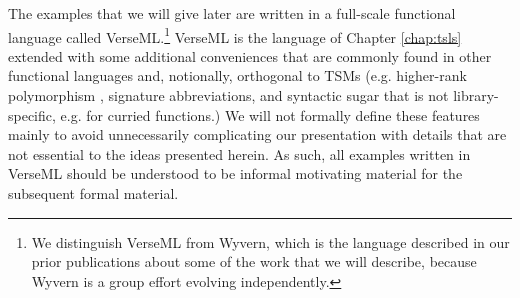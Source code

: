 The examples that we will give later are written in a full-scale functional language called VerseML.\footnote{We distinguish VerseML from Wyvern, which is the language described in our prior publications about some of the work that we will describe, because Wyvern is a group effort evolving independently.} VerseML is the language of Chapter \ref{chap:tsls}  extended with some additional conveniences that are commonly found in other functional languages and, notionally, orthogonal to TSMs (e.g. higher-rank polymorphism \cite{conf/icfp/DunfieldK13}, signature abbreviations, and syntactic sugar that is not library-specific, e.g. for curried functions.) %
We will not formally define these features mainly to avoid unnecessarily complicating our presentation with details that are not essential to the ideas presented herein. As such, all examples written in VerseML should be understood to be informal motivating material for the subsequent formal material. %


